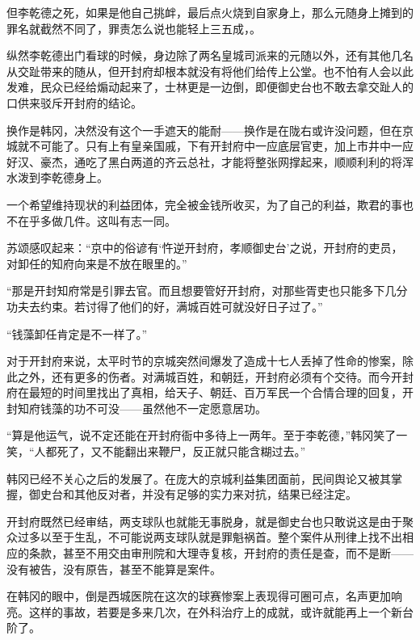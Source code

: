 但李乾德之死，如果是他自己挑衅，最后点火烧到自家身上，那么元随身上摊到的罪名就截然不同了，罪责怎么说也能轻上三五成，。

纵然李乾德出门看球的时候，身边除了两名皇城司派来的元随以外，还有其他几名从交趾带来的随从，但开封府却根本就没有将他们给传上公堂。也不怕有人会以此发难，民众已经给煽动起来了，士林更是一边倒，即便御史台也不敢去拿交趾人的口供来驳斥开封府的结论。

换作是韩冈，决然没有这个一手遮天的能耐——换作是在陇右或许没问题，但在京城就不可能了。只有上有皇亲国戚，下有开封府中一应底层官吏，加上市井中一应好汉、豪杰，通吃了黑白两道的齐云总社，才能将整张网撑起来，顺顺利利的将浑水泼到李乾德身上。

一个希望维持现状的利益团体，完全被金钱所收买，为了自己的利益，欺君的事也不在乎多做几件。这叫有志一同。

苏颂感叹起来：“京中的俗谚有‘忤逆开封府，孝顺御史台’之说，开封府的吏员，对卸任的知府向来是不放在眼里的。”

“那是开封知府常是引罪去官。而且想要管好开封府，对那些胥吏也只能多下几分功夫去约束。若讨得了他们的好，满城百姓可就没好日子过了。”

“钱藻卸任肯定是不一样了。”

对于开封府来说，太平时节的京城突然间爆发了造成十七人丢掉了性命的惨案，除此之外，还有更多的伤者。对满城百姓，和朝廷，开封府必须有个交待。而今开封府在最短的时间里找出了真相，给天子、朝廷、百万军民一个合情合理的回复，开封知府钱藻的功不可没——虽然他不一定愿意居功。

“算是他运气，说不定还能在开封府衙中多待上一两年。至于李乾德，”韩冈笑了一笑，“人都死了，又不能翻出来鞭尸，反正就只能含糊过去。”

韩冈已经不关心之后的发展了。在庞大的京城利益集团面前，民间舆论又被其掌握，御史台和其他反对者，并没有足够的实力来对抗，结果已经注定。

开封府既然已经审结，两支球队也就能无事脱身，就是御史台也只敢说这是由于聚众过多以至于生乱，不可能说两支球队就是罪魁祸首。整个案件从刑律上找不出相应的条款，甚至不用交由审刑院和大理寺复核，开封府的责任是查，而不是断——没有被告，没有原告，甚至不能算是案件。

在韩冈的眼中，倒是西城医院在这次的球赛惨案上表现得可圈可点，名声更加响亮。这样的事故，若要是多来几次，在外科治疗上的成就，或许就能再上一个新台阶了。

